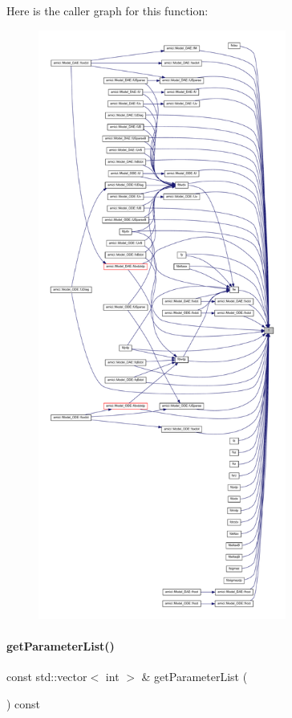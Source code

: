 Here is the caller graph for this function\+:
\nopagebreak
\begin{figure}[H]
\begin{center}
\leavevmode
\includegraphics[height=550pt]{classamici_1_1_model_a711281d57e9710226face29151cc4641_icgraph}
\end{center}
\end{figure}
\mbox{\label{classamici_1_1_model_a94b6dfdb4883c916627b287e4d7b9b44}} 
\paragraph{\texorpdfstring{getParameterList()}{getParameterList()}}
{\footnotesize\ttfamily const std\+::vector$<$ int $>$ \& get\+Parameter\+List (\begin{DoxyParamCaption}{ }\end{DoxyParamCaption}) const}

